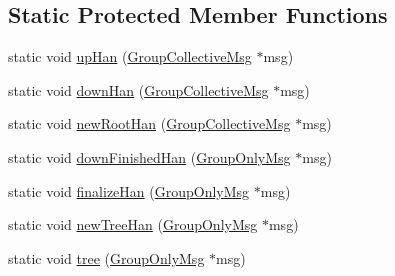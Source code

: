 \subsection*{Static Protected Member Functions}
\begin{DoxyCompactItemize}
\item 
static void \hyperlink{structvt_1_1group_1_1_info_coll_a18031bc67be6fe75bf4bb04dbf4f5156}{up\+Han} (\hyperlink{namespacevt_1_1group_a4c1183efe0185992fefb3ab38a55a8a7}{Group\+Collective\+Msg} $\ast$msg)
\item 
static void \hyperlink{structvt_1_1group_1_1_info_coll_a39c744a7ce406b9e14173aef499c6458}{down\+Han} (\hyperlink{namespacevt_1_1group_a4c1183efe0185992fefb3ab38a55a8a7}{Group\+Collective\+Msg} $\ast$msg)
\item 
static void \hyperlink{structvt_1_1group_1_1_info_coll_a1c37f69107e014a3aef10346e5ebe0c7}{new\+Root\+Han} (\hyperlink{namespacevt_1_1group_a4c1183efe0185992fefb3ab38a55a8a7}{Group\+Collective\+Msg} $\ast$msg)
\item 
static void \hyperlink{structvt_1_1group_1_1_info_coll_ac932b886b6e0beac88966f0f0edae68a}{down\+Finished\+Han} (\hyperlink{namespacevt_1_1group_a864fcf6bc821eacf8350bf4ad15e51b3}{Group\+Only\+Msg} $\ast$msg)
\item 
static void \hyperlink{structvt_1_1group_1_1_info_coll_a6988596b1faad0eb1ba49a2bd54e52e8}{finalize\+Han} (\hyperlink{namespacevt_1_1group_a864fcf6bc821eacf8350bf4ad15e51b3}{Group\+Only\+Msg} $\ast$msg)
\item 
static void \hyperlink{structvt_1_1group_1_1_info_coll_ac0054acdfecccf525613a95997d79e20}{new\+Tree\+Han} (\hyperlink{namespacevt_1_1group_a864fcf6bc821eacf8350bf4ad15e51b3}{Group\+Only\+Msg} $\ast$msg)
\item 
static void \hyperlink{structvt_1_1group_1_1_info_coll_a9adf8eaa0ccf1115e2b015f170a7d83e}{tree} (\hyperlink{namespacevt_1_1group_a864fcf6bc821eacf8350bf4ad15e51b3}{Group\+Only\+Msg} $\ast$msg)
\end{DoxyCompactItemize}
